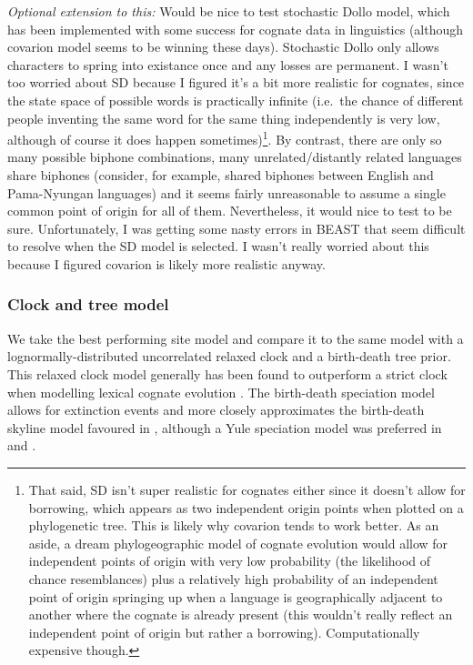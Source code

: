 \documentclass[]{article}
\begin{document}
\emph{Optional extension to this:} Would be nice to test stochastic Dollo model, which has been implemented with some success for cognate data in linguistics (although covarion model seems to be winning these days). Stochastic Dollo only allows characters to spring into existance once and any losses are permanent. I wasn't too worried about SD because I figured it's a bit more realistic for cognates, since the state space of possible words is practically infinite (i.e.~the chance of different people inventing the same word for the same thing independently is very low, although of course it does happen sometimes)\footnote{That said, SD isn't super realistic for cognates either since it doesn't allow for borrowing, which appears as two independent origin points when plotted on a phylogenetic tree. This is likely why covarion tends to work better. As an aside, a dream phylogeographic model of cognate evolution would allow for independent points of origin with very low probability (the likelihood of chance resemblances) plus a relatively high probability of an independent point of origin springing up when a language is geographically adjacent to another where the cognate is already present (this wouldn't really reflect an independent point of origin but rather a borrowing). Computationally expensive though.}. By contrast, there are only so many possible biphone combinations, many unrelated/distantly related languages share biphones (consider, for example, shared biphones between English and Pama-Nyungan languages) and it seems fairly unreasonable to assume a single common point of origin for all of them. Nevertheless, it would nice to test to be sure. Unfortunately, I was getting some nasty errors in BEAST that seem difficult to resolve when the SD model is selected. I wasn't really worried about this because I figured covarion is likely more realistic anyway.

\hypertarget{clock-and-tree-model}{%
\subsubsection{Clock and tree model}\label{clock-and-tree-model}}

We take the best performing site model and compare it to the same model with a lognormally-distributed uncorrelated relaxed clock and a birth-death tree prior. This relaxed clock model generally has been found to outperform a strict clock when modelling lexical cognate evolution \autocites{bouckaert_origin_2018}{kolipakam_bayesian_2018}. The birth-death speciation model allows for extinction events and more closely approximates the birth-death skyline model favoured in \textcite{bouckaert_origin_2018}, although a Yule speciation model was preferred in \textcite{bowern_computational_2012} and \textcite{kolipakam_bayesian_2018}.
\end{document}
